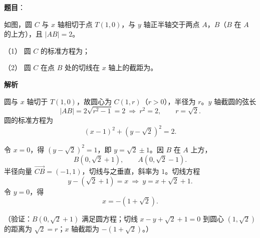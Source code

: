 \begin{answer}

\textbf{题目}：

如图，圆 \(C\) 与 \(x\) 轴相切于点 \(T(1,0)\)，与 \(y\) 轴正半轴交于两点 \(A\)，\(B\)（\(B\) 在 \(A\) 的上方），且 \(|AB|=2\)。

（1） 圆 \(C\) 的标准方程为\gkblank{}；

（2） 圆 \(C\) 在点 \(B\) 处的切线在 \(x\) 轴上的截距为\gkblank{}。
\nopagebreak[4]
\begin{center}\end{center}
\nopagebreak[4]
\textbf{解析}


圆与 \(x\) 轴切于 \(T(1,0)\)，故圆心为 \(C(1,r)\)（\(r>0\)），半径为 \(r\)。\(y\) 轴截圆的弦长
\nopagebreak[4]
\[
|AB|=2\sqrt{r^2-1}=2
\ \Longrightarrow\ r^2=2,\qquad r=\sqrt2.
\]
圆的标准方程为
\nopagebreak[4]
\[
(x-1)^2+(y-\sqrt2)^2=2.
\]


令 \(x=0\)，得 \((y-\sqrt2)^2=1\)，即 \(y=\sqrt2\pm1\)。因 \(B\) 在 \(A\) 上方，
\nopagebreak[4]
\[
B(0,\sqrt2+1),\qquad A(0,\sqrt2-1).
\]
半径向量 \(\overrightarrow{CB}=(-1,1)\)，切线与之垂直，斜率为 \(1\)。切线方程
\nopagebreak[4]
\[
y-(\sqrt2+1)=x
\ \Longrightarrow\ y=x+\sqrt2+1.
\]
令 \(y=0\)，得
\nopagebreak[4]
\[
x=-(1+\sqrt2).
\]

（验证：\(B(0,\sqrt2+1)\) 满足圆方程；切线 \(x-y+\sqrt2+1=0\) 到圆心 \((1,\sqrt2)\) 的距离为 \(\sqrt2=r\)；\(x\) 轴截距为 \(-(1+\sqrt2)\)。）



\end{answer}
